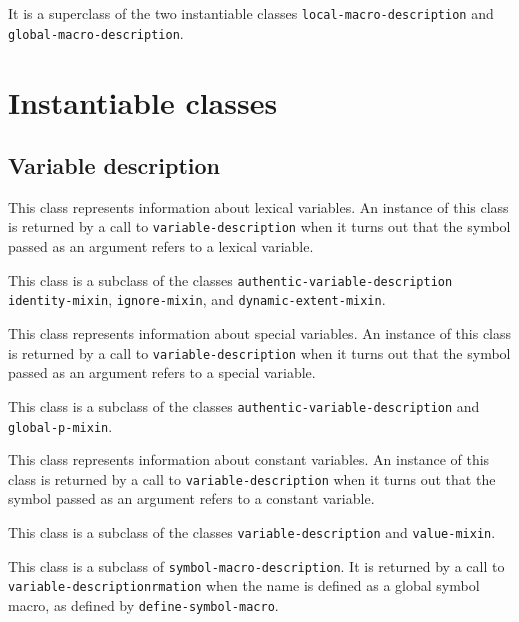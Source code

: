 It is a superclass of the two instantiable classes
\texttt{local-macro-description} and
\texttt{global-macro-description}.

\section{Instantiable classes}

\subsection{Variable description}
\label{sec-instantiable-classes-variable-desciption}

{\footnotesize
{}
}

This class represents information about lexical variables.  An
instance of this class is returned by a call to \texttt{variable-description}
when it turns out that the symbol passed as an argument refers to a
lexical variable.

This class is a subclass of the classes
\texttt{authentic-variable-description} \texttt{identity-mixin},
\texttt{ignore-mixin}, and \texttt{dynamic-extent-mixin}.

{\footnotesize
{}
}

This class represents information about special variables.   An
instance of this class is returned by a call to \texttt{variable-description}
when it turns out that the symbol passed as an argument refers to a
special variable.

This class is a subclass of the classes
\texttt{authentic-variable-description} and \texttt{global-p-mixin}.

{\footnotesize
{}
}

This class represents information about constant variables.   An
instance of this class is returned by a call to \texttt{variable-description}
when it turns out that the symbol passed as an argument refers to a
constant variable.

This class is a subclass of the classes \texttt{variable-description} and
\texttt{value-mixin}.

{\footnotesize
{}
}

This class is a subclass of \texttt{symbol-macro-description}.  It is
returned by a call to \texttt{variable-descriptionrmation} when the name is
defined as a global symbol macro, as defined by
\texttt{define-symbol-macro}.

